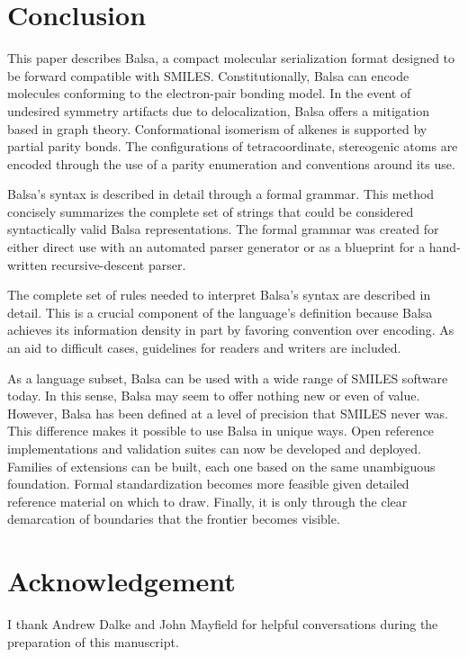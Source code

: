 \documentclass{article}
\begin{document}
\section*{Conclusion}

This paper describes Balsa, a compact molecular serialization format designed to be forward compatible with SMILES. Constitutionally, Balsa can encode molecules conforming to the electron-pair bonding model. In the event of undesired symmetry artifacts due to delocalization, Balsa offers a mitigation based in graph theory. Conformational isomerism of alkenes is supported by partial parity bonds. The configurations of tetracoordinate, stereogenic atoms are encoded through the use of a parity enumeration and conventions around its use.

Balsa's syntax is described in detail through a formal grammar. This method concisely summarizes the complete set of strings that could be considered syntactically valid Balsa representations. The formal grammar was created for either direct use with an automated parser generator or as a blueprint for a hand-written recursive-descent parser.

The complete set of rules needed to interpret Balsa's syntax are described in detail. This is a crucial component of the language's definition because Balsa achieves its information density in part by favoring convention over encoding. As an aid to difficult cases, guidelines for readers and writers are included.

As a language subset, Balsa can be used with a wide range of SMILES software today. In this sense, Balsa may seem to offer nothing new or even of value. However, Balsa has been defined at a level of precision that SMILES never was. This difference makes it possible to use Balsa in unique ways. Open reference implementations and validation suites can now be developed and deployed. Families of extensions can be built, each one based on the same unambiguous foundation. Formal standardization becomes more feasible given detailed reference material on which to draw. Finally, it is only through the clear demarcation of boundaries that the frontier becomes visible.

\section*{Acknowledgement}

I thank Andrew Dalke and John Mayfield for helpful conversations during the preparation of this manuscript.

\clearpage
\printbibliography
\end{document}
